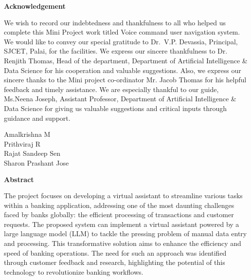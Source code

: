 \newpage
\thispagestyle{empty}
\begin{center}
  \vspace*{1cm}
  \textbf{\large Acknowledgement}
\end{center}
We wish to record our indebtedness and thankfulness to all who helped us complete this Mini Project work titled Voice command user navigation system. We would like to convey our special gratitude to Dr.~V.P. Devassia, Principal, SJCET, Palai, for the facilities. We express our sincere thankfulness to Dr. Renjith Thomas, Head of the department, Department of Artificial Intelligence \& Data Science for his cooperation and valuable suggestions. Also, we express our sincere thanks to the Mini project co-ordinator Mr. Jacob Thomas for his helpful feedback and timely assistance.
We are especially thankful to our guide, Ms.Neena Joseph, Assistant Professor, Department of Artificial Intelligence \& Data Science for giving us valuable suggestions and critical inputs through guidance and support.
 \\
\begin{flushright}
Amalkrishna M \\
Prithviraj R \\
Rajat Sandeep Sen \\
Sharon Prashant Jose
\end{flushright}

\newpage
\thispagestyle{empty}
\begin{center}
  \textbf{\large Abstract}
\end{center}
The project focuses on developing a virtual assistant to streamline various tasks within a banking application, addressing one of the most daunting challenges faced by banks globally: the efficient processing of transactions and customer requests. The proposed system can implement a virtual assistant powered by a large language model (LLM) to tackle the pressing problem of manual data entry and processing. This transformative solution aims to enhance the efficiency and speed of banking operations. The need for such an approach was identified through customer feedback and research, highlighting the potential of this technology to revolutionize banking workflows.

